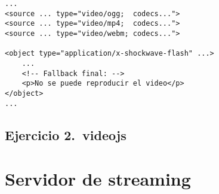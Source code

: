 \begin{verbatim}
...
<source ... type="video/ogg;  codecs...">
<source ... type="video/mp4;  codecs...">
<source ... type="video/webm; codecs...">

<object type="application/x-shockwave-flash" ...>
	...
	<!-- Fallback final: -->
	<p>No se puede reproducir el video</p>
</object>
...
\end{verbatim}

\subsection{Ejercicio 2.~videojs}

\section{Servidor de streaming}
